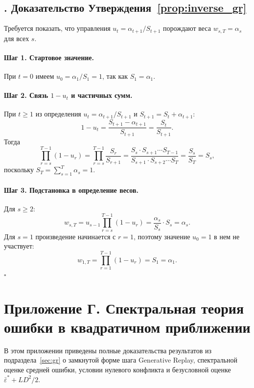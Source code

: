 \documentclass[a4paper,14pt,oneside,openany]{extarticle}
\begin{document}
\subsection*{\theappthm. Доказательство Утверждения~\ref{prop:inverse_gr}}\label{app:proof_inverse}

Требуется показать, что управления $u_t = \alpha_{t+1}/S_{t+1}$ порождают веса $w_{s, T} = \alpha_s$ для всех $s$.

\paragraph{Шаг 1. Стартовое значение.} При $t = 0$ имеем $u_0 = \alpha_1 / S_1 = 1$, так как $S_1 = \alpha_1$.

\paragraph{Шаг 2. Связь $1 - u_t$ и частичных сумм.} При $t \ge 1$ из определения $u_t = \alpha_{t+1}/S_{t+1}$ и $S_{t+1} = S_t + \alpha_{t+1}$:
\[
    1 - u_t = \frac{S_{t+1} - \alpha_{t+1}}{S_{t+1}} = \frac{S_t}{S_{t+1}}.
\]
Тогда
\[
    \prod_{r=s}^{T-1}(1 - u_r) = \prod_{r=s}^{T-1}\frac{S_r}{S_{r+1}} = \frac{S_s \cdot S_{s+1}\cdots S_{T-1}}{S_{s+1}\cdot S_{s+2}\cdots S_T} = \frac{S_s}{S_T} = S_s,
\]
поскольку $S_T = \sum_{s=1}^T \alpha_s = 1$.

\paragraph{Шаг 3. Подстановка в определение весов.} Для $s \ge 2$:
\[
    w_{s, T} = u_{s-1}\prod_{r=s}^{T-1}(1 - u_r) = \frac{\alpha_s}{S_s} \cdot S_s = \alpha_s.
\]
Для $s = 1$ произведение начинается с $r = 1$, поэтому значение $u_0 = 1$ в нем не участвует:
\[
    w_{1, T} = \prod_{r=1}^{T-1}(1 - u_r) = S_1 = \alpha_1.
\]
\hfill$\square$

\newpage
\cleardoublepage
{}
{}
\section*{Приложение Г. Спектральная теория ошибки в квадратичном приближении}

В этом приложении приведены полные доказательства результатов из подраздела~\ref{sec:gr} о замкнутой форме шага Generative Replay, спектральной оценке средней ошибки, условии нулевого конфликта и безусловной оценке $\bar\varepsilon^* + LD^2/2$.
\end{document}
